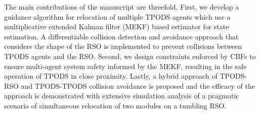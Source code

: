 The main contributions of the manuscript are threefold. First, we develop a guidance algorithm for relocation of multiple TPODS agents which use a multiplicative extended Kalman filter (MEKF) based estimator for state estimation. A differentiable collision detection and avoidance approach that considers the shape of the RSO is implemented to prevent collisions between TPODS agents and the RSO. Second, we design constraints enforced by CBFs to ensure multi-agent system safety informed by the MEKF, resulting in the safe operation of TPODS in close proximity. Lastly, a hybrid approach of TPODS-RSO and TPODS-TPODS collision avoidance is proposed and the efficacy of the approach is demonstrated with extensive simulation analysis of a pragmatic scenario of simultaneous relocation of two modules on a tumbling RSO.


